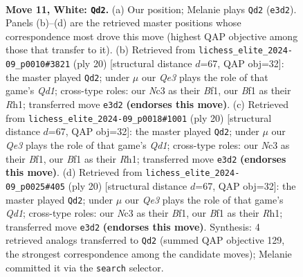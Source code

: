 \documentclass[11pt]{article}
\begin{document}
\clearpage

\begin{figure}[p]\centering
\begin{subfigure}{0.46\textwidth}\centering
\resizebox{\linewidth}{!}{%
\newchessgame
\chessboard[
  setfen={rnb1r2k/pp1nqppp/2p1p3/3pP3/3P4/2N1Q3/PPP2PPP/2K1RBNR w - - 0 11},
  showmover=false,
  pgfstyle=straightmove, color=movearrow, markmove={e3-d2}
]}
\caption{}
\end{subfigure}\hfill
\begin{subfigure}{0.46\textwidth}\centering
\resizebox{\linewidth}{!}{%
\newchessgame
\chessboard[
  setfen={rn1qkb1r/1p3p2/p2p1np1/3Pp2p/8/1N2BP2/PPP3PP/R2QKB1R w KQkq - 0 11},
  showmover=false,
  pgfstyle=straightmove, color=movearrow, markmove={d1-d2}
]}
\caption{}
\end{subfigure}
\\[4pt]
\begin{subfigure}{0.46\textwidth}\centering
\resizebox{\linewidth}{!}{%
\newchessgame
\chessboard[
  setfen={rn1qkb1r/1p3p2/p2p1np1/3Pp2p/8/1N2BP2/PPP3PP/R2QKB1R w KQkq - 0 11},
  showmover=false,
  pgfstyle=straightmove, color=movearrow, markmove={d1-d2}
]}
\caption{}
\end{subfigure}\hfill
\begin{subfigure}{0.46\textwidth}\centering
\resizebox{\linewidth}{!}{%
\newchessgame
\chessboard[
  setfen={rn1qkb1r/1p3p2/p2p1np1/3Pp2p/8/1N2BP2/PPP3PP/R2QKB1R w KQkq - 0 11},
  showmover=false,
  pgfstyle=straightmove, color=movearrow, markmove={d1-d2}
]}
\caption{}
\end{subfigure}
\caption{\textbf{Move 11, White: \texttt{Qd2}.} (a) Our position; Melanie plays \texttt{Qd2} (\texttt{e3d2}). Panels (b)--(d) are the retrieved master positions whose correspondence most drove this move (highest QAP objective among those that transfer to it). (b) Retrieved from \texttt{lichess\_elite\_2024-09\_p0010\#3821} (ply 20) [structural distance $d$=67, QAP obj=32]: the master played \texttt{Qd2}; under $\mu$ our \emph{Qe3} plays the role of that game's \emph{Qd1}; cross-type roles: our \emph{N}c3 as their \emph{B}f1, our \emph{B}f1 as their \emph{R}h1; transferred move \texttt{e3d2} \textbf{(endorses this move)}. (c) Retrieved from \texttt{lichess\_elite\_2024-09\_p0018\#1001} (ply 20) [structural distance $d$=67, QAP obj=32]: the master played \texttt{Qd2}; under $\mu$ our \emph{Qe3} plays the role of that game's \emph{Qd1}; cross-type roles: our \emph{N}c3 as their \emph{B}f1, our \emph{B}f1 as their \emph{R}h1; transferred move \texttt{e3d2} \textbf{(endorses this move)}. (d) Retrieved from \texttt{lichess\_elite\_2024-09\_p0025\#405} (ply 20) [structural distance $d$=67, QAP obj=32]: the master played \texttt{Qd2}; under $\mu$ our \emph{Qe3} plays the role of that game's \emph{Qd1}; cross-type roles: our \emph{N}c3 as their \emph{B}f1, our \emph{B}f1 as their \emph{R}h1; transferred move \texttt{e3d2} \textbf{(endorses this move)}. Synthesis: 4 retrieved analogs transferred to \texttt{Qd2} (summed QAP objective 129, the strongest correspondence among the candidate moves); Melanie committed it via the \texttt{search} selector.}
\label{fig:thought-m20}
\end{figure}
\end{document}
